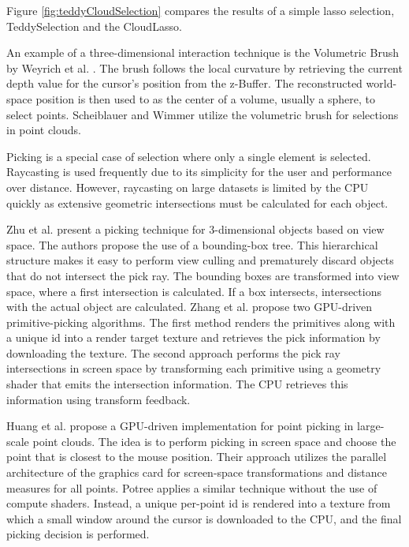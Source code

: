 Figure \ref{fig:teddyCloudSelection} compares the results of a simple lasso selection, TeddySelection and the CloudLasso. 

\par

An example of a three-dimensional interaction technique is the Volumetric Brush by Weyrich et al. \cite{weyrich2004post}. The brush follows the local curvature by retrieving the current depth value for the cursor's position from the z-Buffer. The reconstructed world-space position is then used to as the center of a volume, usually a sphere, to select points. Scheiblauer and Wimmer \cite{scheiblauer2011out} utilize the volumetric brush for selections in point clouds. 

\par

Picking is a special case of selection where only a single element is selected. Raycasting is used frequently due to its simplicity for the user and performance over distance. However, raycasting on large datasets is limited by the CPU quickly as extensive geometric intersections must be calculated for each object. 

\par

Zhu et al. \cite{zhu2008algorithm} present a picking technique for 3-dimensional objects based on view space. The authors propose the use of a bounding-box tree. This hierarchical structure makes it easy to perform view culling and prematurely discard objects that do not intersect the pick ray. The bounding boxes are transformed into view space, where a first intersection is calculated. If a box intersects, intersections with the actual object are calculated. 
Zhang et al. \cite{zhang20093d} propose two GPU-driven primitive-picking algorithms. The first method renders the primitives along with a unique id into a render target texture and retrieves the pick information by downloading the texture. The second approach performs the pick ray intersections in screen space by transforming each primitive using a geometry shader that emits the intersection information. The CPU retrieves this information using transform feedback.

\par

Huang et al. \cite{huang2014pickup} propose a GPU-driven implementation for point picking in large-scale point clouds. The idea is to perform picking in screen space and choose the point that is closest to the mouse position. Their approach utilizes the parallel architecture of the graphics card for screen-space transformations and distance measures for all points. Potree \cite{SCHUETZ-2016-POT} applies a similar technique without the use of compute shaders. Instead, a unique per-point id is rendered into a texture from which a small window around the cursor is downloaded to the CPU, and the final picking decision is performed.  